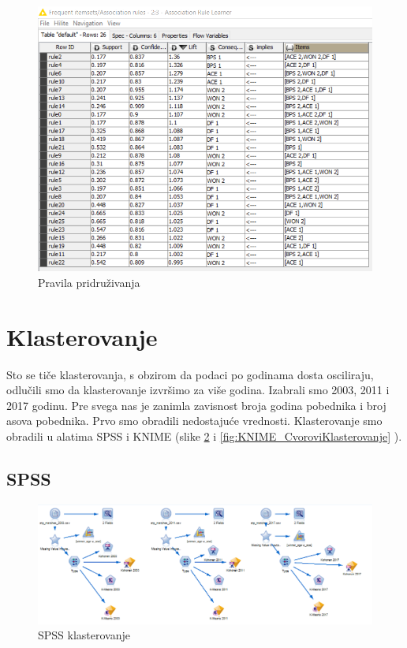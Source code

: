 \documentclass[a4paper]{article}
\begin{document}
\begin{figure}[H]
	\begin{center}
		\includegraphics[scale=0.6]{KNIME_project/PravilaPridruzivanja/rule_learner_2009}
	\end{center}
	\caption{Pravila pridruživanja}
	\label{fig:rule_learner}
\end{figure}

\section{Klasterovanje}

Sto se tiče klasterovanja, s obzirom da podaci po godinama dosta osciliraju, odlučili smo da klasterovanje izvršimo za više godina. Izabrali smo 2003, 2011 i 2017 godinu. Pre svega nas je zanimla zavisnost broja godina pobednika i broj asova pobednika. Prvo smo obradili nedostajuće vrednosti. Klasterovanje smo obradili u alatima SPSS i KNIME (slike \ref{fig:SPSS_CvoroviKlasterovanje} i \ref{fig:KNIME_CvoroviKlasterovanje} ). 

\subsection{SPSS}
 
\begin{figure}[H]
	\begin{center}
		\includegraphics[scale=0.60]{Klasterovanje/SPSS_Cvorovi.png}
	\end{center}
	\caption{SPSS klasterovanje}
	\label{fig:SPSS_CvoroviKlasterovanje}
\end{figure}
\end{document}

